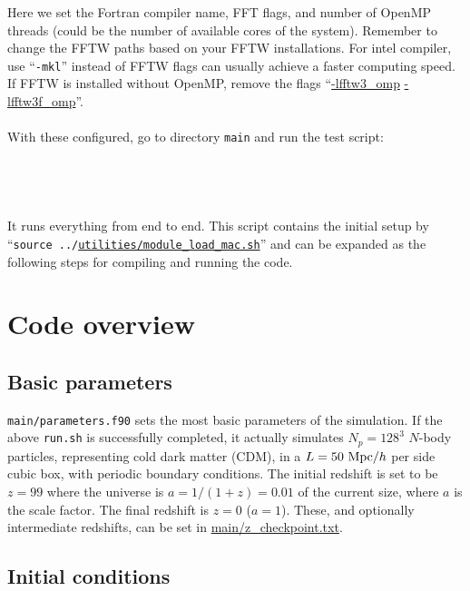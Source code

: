\documentclass[12pt]{article}
\begin{document}
Here we set the Fortran compiler name, FFT flags, and number of OpenMP threads (could be the number of available cores of the system). Remember to change the FFTW paths based on your FFTW installations. For intel compiler, use ``{\tt -mkl}'' instead of FFTW flags can usually achieve a faster computing speed. If FFTW is installed without OpenMP, remove the flags ``\url{-lfftw3_omp} \url{-lfftw3f_omp}''.
\\\\
With these configured, go to directory {\tt main} and run the test script:
\\\\
\\
\\\\
It runs everything from end to end. This script contains the initial setup by ``{\tt source ../\url{utilities/module_load_mac.sh}}'' and can be expanded as the following steps for compiling and running the code.

\section{Code overview}

\subsection{Basic parameters}
{\tt main/parameters.f90} sets the most basic parameters of the simulation. If the above {\tt run.sh} is successfully completed, it actually simulates $N_p=128^3$ $N$-body particles, representing cold dark matter (CDM), in a $L=50\ {\rm Mpc}/h$ per side cubic box, with periodic boundary conditions. The initial redshift is set to be $z=99$ where the universe is $a=1/(1+z)=0.01$ of the current size, where $a$ is the scale factor. The final redshift is $z=0$ ($a=1$). These, and optionally intermediate redshifts, can be set in \url{main/z_checkpoint.txt}.

\subsection{Initial conditions}
\end{document}
